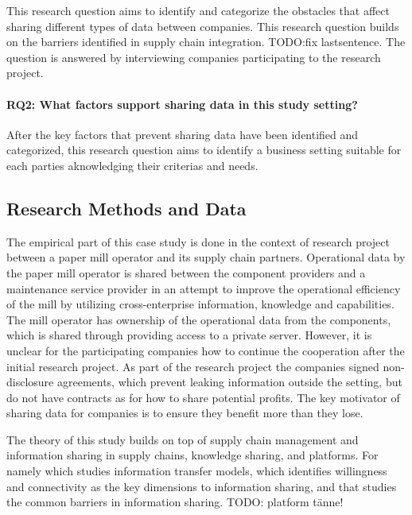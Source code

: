 This research question aims to identify and categorize the obstacles that affect sharing different types of data between companies. This research question builds on the barriers identified in supply chain integration. TODO:fix lastsentence. The question is answered by interviewing companies participating to the research project. 







\paragraph*{RQ2: What factors support sharing data in this study setting?}

After the key factors that prevent sharing data have been identified and categorized, this research question aims to identify a business setting suitable for each parties aknowledging their criterias and needs. 



\subsection{Research Methods and Data}
The empirical part of this case study is done in the context of research project between a paper mill operator and its supply chain partners. Operational data by the paper mill operator is shared between the component providers and a maintenance service provider in an attempt to improve the operational efficiency of the mill by utilizing cross-enterprise information, knowledge and capabilities. The mill operator has ownership of the operational data from the components, which is shared through providing access to a private server. However, it is unclear for the participating companies how to continue the cooperation after the initial research project. As part of the research project the companies signed non-disclosure agreements, which prevent leaking information outside the setting, but do not have contracts as for how to share potential profits. The key motivator of sharing data for companies is to ensure they benefit more than they lose.

The theory of this study builds on top of supply chain management and information sharing in supply chains, knowledge sharing, and platforms. For namely \cite{lee2000information} which studies information transfer models, \cite{croom2007information} which identifies willingness and connectivity as the key dimensions to information sharing, and \cite{} that studies the common barriers in information sharing. TODO: platform tänne!


